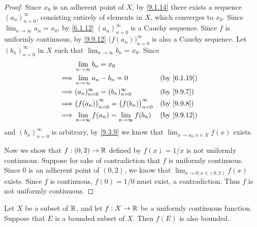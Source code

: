 \begin{proof}
  Since \(x_0\) is an adherent point of \(X\), by \cref{9.1.14} there exists a sequence \((a_n)_{n = 0}^\infty\), consisting entirely of elements in \(X\), which converges to \(x_0\).
  Since \(\lim_{n \to \infty} a_n = x_0\), by \cref{6.1.12} \((a_n)_{n = 0}^\infty\) is a Cauchy sequence.
  Since \(f\) is uniformly continuous, by \cref{9.9.12} \(\big(f(a_n)\big)_{n = 0}^\infty\) is also a Cauchy sequence.
  Let \((b_n)_{n = 0}^\infty\) in \(X\) such that \(\lim_{n \to \infty} b_n = x_0\).
  Since
  \begin{align*}
             & \lim_{n \to \infty} b_n = x_0                                                                    \\
    \implies & \lim_{n \to \infty} a_n - b_n = 0                                 &  & \text{(by \cref{6.1.19})} \\
    \implies & (a_n)_{n = 0}^\infty = (b_n)_{n = 0}^\infty                       &  & \text{(by \cref{9.9.7})}  \\
    \implies & \big(f(a_n)\big)_{n = 0}^\infty = \big(f(b_n)\big)_{n = 0}^\infty &  & \text{(by \cref{9.9.8})}  \\
    \implies & \lim_{n \to \infty} f(a_n) = \lim_{n \to \infty} f(b_n)           &  & \text{(by \cref{9.9.12})}
  \end{align*}
  and \((b_n)_{n = 0}^\infty\) is arbitrary, by \cref{9.3.9} we know that \(\lim_{x \to x_0 ; x \in X} f(x)\) exists.

  Now we show that \(f : (0, 2) \to \mathbb{R}\) defined by \(f(x) = 1 / x\) is not uniformly continuous.
  Suppose for sake of contradiction that \(f\) is uniformly continuous.
  Since \(0\) is an adherent point of \((0, 2)\), we know that \(\lim_{x \to 0 ; x \in (0, 2)} f(x)\) exists.
  Since \(f\) is continuous, \(f(0) = 1 / 0\) must exist, a contradiction.
  Thus \(f\) is not uniformly continuous.
\end{proof}

\begin{prop}\label{9.9.15}
  Let \(X\) be a subset of \(\mathbb{R}\), and let \(f : X \to \mathbb{R}\) be a uniformly continuous function.
  Suppose that \(E\) is a bounded subset of \(X\).
  Then \(f(E)\) is also bounded.
\end{prop}

